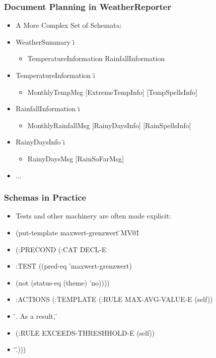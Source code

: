 \documentclass[compress,color=usenames]{beamer}
\begin{document}
\begin{frame}
\frametitle{Document Planning in WeatherReporter}

\label{f144}
\begin{itemize}
\item { {A More Complex Set of Schemata:}}

\item { {WeatherSummary \"{\i}{{}}}}
\begin{itemize}
\item TemperatureInformation RainfallInformation
\end{itemize}
\item { {TemperatureInformation \"{\i}{{}}}}
\begin{itemize}
\item MonthlyTempMsg \mbox{$[$}ExtremeTempInfo\mbox{$]$} \mbox{$[$}TempSpellsInfo\mbox{$]$}
\end{itemize}
\item { {RainfallInformation \"{\i}{{}}}}
\begin{itemize}
\item MonthlyRainfallMsg \mbox{$[$}RainyDaysInfo\mbox{$]$} \mbox{$[$}RainSpellsInfo\mbox{$]$}
\end{itemize}
\item { {RainyDaysInfo \"{\i}{{}}}}
\begin{itemize}
\item RainyDaysMsg \mbox{$[$}RainSoFarMsg\mbox{$]$}
\end{itemize}
\item { {...}}
\end{itemize}

\end{frame}

\begin{frame}
\frametitle{Schemas in Practice }

\label{f146}
\begin{itemize}
\item { {Tests and other machinery are often made explicit:}}

\item { {(put-template maxwert-grenzwert \"{}MV01\"{}}}
\item { { (:PRECOND (:CAT DECL-E}}
\item { { :TEST ((pred-eq 'maxwert-grenzwert)}}
\item { {  (not (status-eq (theme) 'no))))}}
\item { { :ACTIONS (:TEMPLATE (:RULE MAX-AVG-VALUE-E (self))}}
\item { {   \"{}. As a result, \"{}}}
\item { {  (:RULE EXCEEDS-THRESHHOLD-E (self))}}
\item { {   \"{}.\"{})))}}
\end{itemize}

 
\end{frame}
\end{document}

